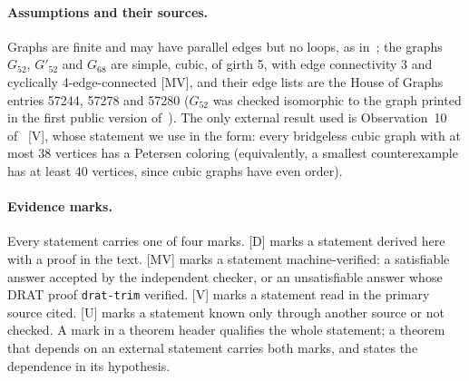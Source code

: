 \documentclass[11pt]{article}
\theoremstyle{definition}
\theoremstyle{remark}
\newcommand{\Ga}{G_{52}}
\newcommand{\Gb}{G'_{52}}
\newcommand{\Gsix}{G_{68}}
\newcommand{\evD}{\textnormal{[D]}}
\newcommand{\evMV}{\textnormal{[MV]}}
\newcommand{\evV}{\textnormal{[V]}}
\newcommand{\evU}{\textnormal{[U]}}
\begin{document}
\paragraph{Assumptions and their sources.} Graphs are finite and may have parallel edges but no loops, as in~\cite{MMSW2025};
the graphs $\Ga$, $\Gb$ and $\Gsix$ are simple, cubic, of girth 5, with edge connectivity 3 and cyclically 4-edge-connected
\evMV{}, and their edge lists are the House of Graphs entries 57244, 57278 and 57280 ($\Ga$ was checked isomorphic to the graph
printed in the first public version of~\cite{GJMMM2026zenodo}). The only external result used is Observation~10
of~\cite{GJMMMU2026} \evV{}, whose statement we use in the form: every bridgeless cubic graph with at most 38 vertices
has a Petersen coloring (equivalently, a smallest counterexample has at least 40 vertices, since cubic graphs have even order).

\paragraph{Evidence marks.} Every statement carries one of four marks. \evD{} marks a statement derived here with a proof in
the text. \evMV{} marks a statement machine-verified: a satisfiable answer accepted by the independent checker, or an unsatisfiable
answer whose DRAT proof \texttt{drat-trim} verified. \evV{} marks a statement read in the primary source cited. \evU{} marks a
statement known only through another source or not checked. A mark in a theorem header qualifies the whole statement; a theorem
that depends on an external statement carries both marks, and states the dependence in its hypothesis.
\end{document}
